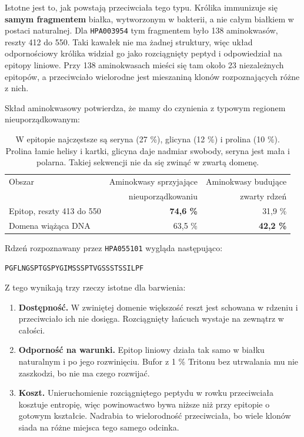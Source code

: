 \documentclass[a4paper,11pt]{report}
\begin{document}
Istotne jest to, jak powstają przeciwciała tego typu. Królika immunizuje się
\textbf{samym fragmentem} białka, wytworzonym w bakterii, a nie całym białkiem
w postaci naturalnej. Dla \texttt{HPA003954} tym fragmentem było 138 aminokwasów,
reszty 412 do 550. Taki kawałek nie ma żadnej struktury, więc układ odpornościowy
królika widział go jako rozciągnięty peptyd i odpowiedział na epitopy liniowe.
Przy 138 aminokwasach mieści się tam około 23 niezależnych epitopów, a przeciwciało
wielorodne jest mieszaniną klonów rozpoznających różne z nich.

Skład aminokwasowy potwierdza, że mamy do czynienia z typowym regionem
nieuporządkowanym:

\begin{table}[h]
\centering
\begin{tabular}{lrr}
\toprule
Obszar & Aminokwasy sprzyjające & Aminokwasy budujące \\
       & nieuporządkowaniu      & zwarty rdzeń \\
\midrule
Epitop, reszty 413 do 550 & \textbf{74,6 \%} & 31,9 \% \\
Domena wiążąca DNA & 63,5 \% & \textbf{42,2 \%} \\
\bottomrule
\end{tabular}
\caption{W epitopie najczęstsze są seryna (27 \%), glicyna (12 \%) i prolina (10 \%).
Prolina łamie helisy i kartki, glicyna daje nadmiar swobody, seryna jest mała
i polarna. Takiej sekwencji nie da się zwinąć w zwartą domenę.}
\end{table}

Rdzeń rozpoznawany przez \texttt{HPA055101} wygląda następująco:

\begin{center}
\texttt{PGFLNGSPTGSPYGIMSSSPTVGSSSTSSILPF}
\end{center}

Z tego wynikają trzy rzeczy istotne dla barwienia:

\begin{enumerate}
    \item \textbf{Dostępność.} W zwiniętej domenie większość reszt jest schowana
    w rdzeniu i przeciwciało ich nie dosięga. Rozciągnięty łańcuch wystaje na
    zewnątrz w całości.
    \item \textbf{Odporność na warunki.} Epitop liniowy działa tak samo w białku
    naturalnym i po jego rozwinięciu. Bufor z 1 \% Tritonu bez utrwalania mu nie
    zaszkodzi, bo nie ma czego rozwijać.
    \item \textbf{Koszt.} Unieruchomienie rozciągniętego peptydu w rowku
    przeciwciała kosztuje entropię, więc powinowactwo bywa niższe niż przy
    epitopie o gotowym kształcie. Nadrabia to wielorodność przeciwciała, bo wiele
    klonów siada na różne miejsca tego samego odcinka.
\end{enumerate}
\end{document}
